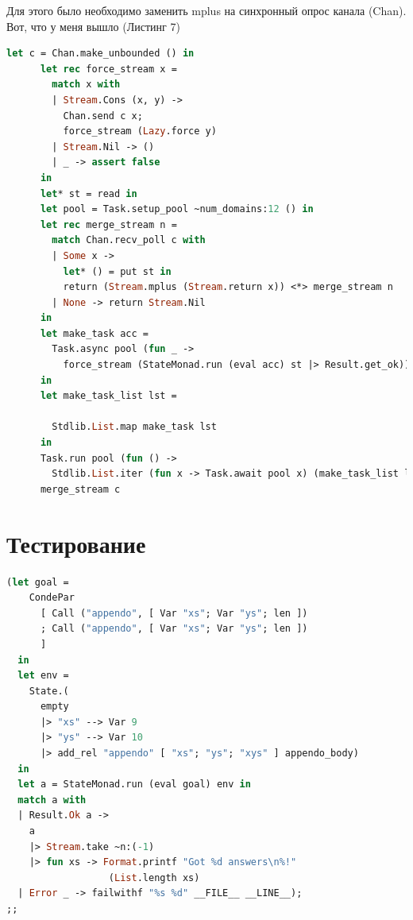 Для этого было необходимо заменить mplus на синхронный опрос канала (Chan). Вот, что у меня вышло (Листинг 7)

\begin{lstlisting}[caption=Parallel Cond$^e$, language=OCaml, frame=single]
  let c = Chan.make_unbounded () in
      let rec force_stream x =
        match x with
        | Stream.Cons (x, y) ->
          Chan.send c x;
          force_stream (Lazy.force y)
        | Stream.Nil -> ()
        | _ -> assert false
      in
      let* st = read in
      let pool = Task.setup_pool ~num_domains:12 () in
      let rec merge_stream n =
        match Chan.recv_poll c with
        | Some x ->
          let* () = put st in
          return (Stream.mplus (Stream.return x)) <*> merge_stream n
        | None -> return Stream.Nil
      in
      let make_task acc =
        Task.async pool (fun _ ->
          force_stream (StateMonad.run (eval acc) st |> Result.get_ok))
      in
      let make_task_list lst =

        Stdlib.List.map make_task lst
      in
      Task.run pool (fun () ->
        Stdlib.List.iter (fun x -> Task.await pool x) (make_task_list lst));
      merge_stream c
\end{lstlisting}


\section{Тестирование}

\begin{lstlisting}[caption=Tests, language=OCaml, frame=single]
  (let goal =
    CondePar
      [ Call ("appendo", [ Var "xs"; Var "ys"; len ])
      ; Call ("appendo", [ Var "xs"; Var "ys"; len ])
      ]
  in
  let env =
    State.(
      empty
      |> "xs" --> Var 9
      |> "ys" --> Var 10
      |> add_rel "appendo" [ "xs"; "ys"; "xys" ] appendo_body)
  in
  let a = StateMonad.run (eval goal) env in
  match a with
  | Result.Ok a ->
    a
    |> Stream.take ~n:(-1)
    |> fun xs -> Format.printf "Got %d answers\n%!" 
                  (List.length xs)
  | Error _ -> failwithf "%s %d" __FILE__ __LINE__);
;;
\end{lstlisting}

